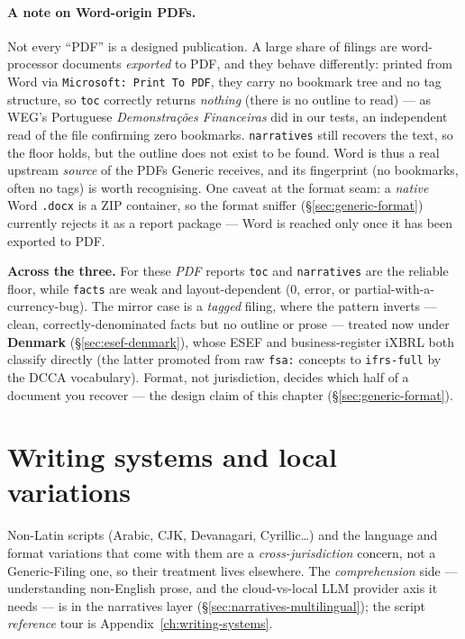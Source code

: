 \documentclass[11pt,a4paper]{report}
\begin{document}
\paragraph{A note on Word-origin PDFs.} Not every ``PDF'' is a designed publication. A large share of filings
are word-processor documents \emph{exported} to PDF, and they behave differently: printed from Word via
\texttt{Microsoft: Print To PDF}, they carry no bookmark tree and no tag structure, so \texttt{toc} correctly
returns \emph{nothing} (there is no outline to read) --- as WEG's Portuguese \emph{Demonstrações Financeiras}
did in our tests, an independent read of the file confirming zero bookmarks. \texttt{narratives} still recovers
the text, so the floor holds, but the outline does not exist to be found. Word is thus a real upstream
\emph{source} of the PDFs Generic receives, and its fingerprint (no bookmarks, often no tags) is worth
recognising. One caveat at the format seam: a \emph{native} Word \texttt{.docx} is a ZIP container, so the
format sniffer (\S\ref{sec:generic-format}) currently rejects it as a report package --- Word is reached only
once it has been exported to PDF.


\medskip
\noindent \textbf{Across the three.} For these \emph{PDF} reports \texttt{toc} and \texttt{narratives} are the
reliable floor, while \texttt{facts} are weak and layout-dependent (0, error, or partial-with-a-currency-bug).
The mirror case is a \emph{tagged} filing, where the pattern inverts --- clean, correctly-denominated facts but
no outline or prose --- treated now under \textbf{Denmark} (\S\ref{sec:esef-denmark}), whose ESEF and
business-register iXBRL both classify directly (the latter promoted from raw \texttt{fsa:} concepts to
\texttt{ifrs-full} by the DCCA vocabulary). Format, not jurisdiction, decides which half of a document you
recover --- the design claim of this chapter (\S\ref{sec:generic-format}).

\section{Writing systems and local variations}

Non-Latin scripts (Arabic, CJK, Devanagari, Cyrillic\ldots) and the language and format variations that come
with them are a \emph{cross-jurisdiction} concern, not a Generic-Filing one, so their treatment lives
elsewhere. The \emph{comprehension} side --- understanding non-English prose, and the cloud-vs-local LLM
provider axis it needs --- is in the narratives layer (\S\ref{sec:narratives-multilingual}); the script
\emph{reference} tour is Appendix~\ref{ch:writing-systems}.
\end{document}
